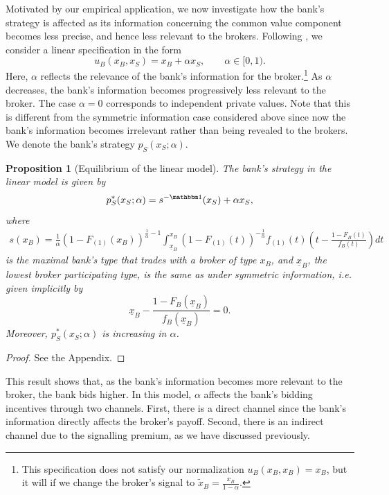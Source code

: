 \documentclass[11pt,twopage]{article}
\newcommand{\AN}[1]{\textcolor{red}{[AN: #1]}}
\newcommand{\AS}[1]{\textcolor{blue}{[AS: #1]}}
\newcommand{\ul}{\underline}
\newtheorem{proposition}{Proposition}
{\bf}{\it}
\begin{document}
Motivated by our empirical application, we now investigate how the
bank's strategy is affected as its information concerning the common
value component becomes less precise, and hence less relevant to the
brokers. Following \cite{cai2007reserve}, we consider a linear
specification in the form
\[ u_B(x_B,x_S) = x_B+\alpha x_S, \quad\quad \alpha \in [0,1).\] Here,
$\alpha$ reflects the relevance of the bank's information for the
broker.\footnote{This specification does not satisfy our normalization
  $u_B(x_B,x_B) = x_B$, but it will if we change the broker's signal
  to $\tilde x_B = \frac{x_B}{1-\alpha}$.}  As $\alpha$ decreases, the
bank's information becomes progressively less relevant to the
broker. The case $\alpha = 0$ corresponds to independent private
values. Note that this is different from the symmetric information
case considered above since now the bank's information becomes
irrelevant rather than being revealed to the brokers. We denote the
bank's strategy $p_S(x_S;\alpha)$.
\begin{proposition}[Equilibrium of the linear model]\label{prop:slope}The bank's strategy in the linear model is given by 
\[ p_S^*(x_S;\alpha) = s^{-\mathbbm 1}(x_S)+\alpha x_S, \]
where 
  \begin{align*}
    s(x_B) = \frac{1}{\alpha}( 1-F_{(1)}(x_B))^{\frac{1}{\alpha} - 1} \int_{\underline
      x_B}^{x_B} (1- F_{(1)}(t))^{-\frac{1}{\alpha}} f_{(1)}(t)\left (t-\frac{1-F_B(t)}{f_B(t)}\right )dt
  \end{align*}
  is the maximal bank's type that trades with a broker of type $x_B$, and $\ul x_B$, the lowest
  broker participating type, is the same as under symmetric
  information, i.e. given implicitly by
  \[
  \ul x_B - \frac{1-F_B(\ul x_B)}{f_B(\ul x_B)} = 0.
  \]
  Moreover, $p_S^*(x_S;\alpha)$ is increasing in $\alpha$.
\end{proposition}
\begin{proof}See the Appendix.
\end{proof}
This result shows that, as the bank's information becomes more
relevant to the broker, the bank bids higher. In this model, $\alpha$
affects the bank's bidding incentives through two channels. First,
there is a direct channel since the bank's information directly
affects the broker's payoff. Second, there is an indirect channel due
to the signalling premium, as we have discussed previously.
\end{document}
